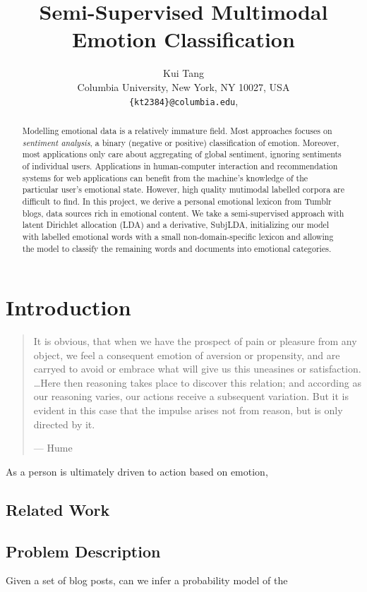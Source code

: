 \documentclass{article}
\title{Semi-Supervised Multimodal Emotion Classification}
\author{
Kui Tang\\
Columbia University, New York, NY 10027, USA\\
\texttt{\{kt2384\}@columbia.edu},
}
\begin{document}
\maketitle

\begin{abstract}
Modelling emotional data is a relatively immature field. Most
approaches focuses on \emph{sentiment analysis}, a binary (negative
or positive) classification of emotion. Moreover, most applications
only care about aggregating of global sentiment, ignoring sentiments
of individual users.  Applications in human-computer interaction
and recommendation systems for web applications can benefit from
the machine's knowledge of the particular user's emotional state.
However, high quality mutimodal labelled corpora are difficult to
find. In this project, we derive a personal emotional lexicon from
Tumblr blogs, data sources rich in emotional content. We take a
semi-supervised approach with latent Dirichlet allocation (LDA) and
a derivative, SubjLDA, initializing our model with labelled emotional
words with a small non-domain-specific lexicon and allowing the
model to classify the remaining words and documents into emotional
categories.
\end{abstract}

\section{Introduction}
\begin{quote}
It is obvious, that when we have the prospect of pain or pleasure
from any object, we feel a consequent emotion of aversion or
propensity, and are carryed to avoid or embrace what will give us
this uneasines or satisfaction. \ldots Here then reasoning takes
place to discover this relation; and according as our reasoning
varies, our actions receive a subsequent variation. But it is evident
in this case that the impulse arises not from reason, but is only
directed by it.

\hspace{9 cm} --- Hume \citep{hume}
\end{quote}
As a person is ultimately driven to action based on emotion, 

\label{sec:introduction}

\subsection{Related Work}
\citep{lin03}
\subsection{Problem Description}
Given a set of blog posts, can we infer a probability model of the 
\end{document}
